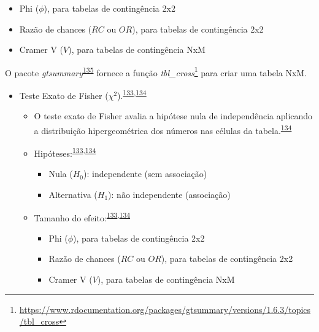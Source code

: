 \documentclass[
  a4paper,
]{book}
\renewcommand{\href}[2]{#2\footnote{\url{#1}}}
\newenvironment{infobox}[1]
  {
  \begin{itemize}
  \renewcommand{\labelitemi}{
    \raisebox{-.7\height}[0pt][0pt]{
      {\setkeys{Gin}{width=3em,keepaspectratio}
        \texttt{[image: \#1]}}
    }
  }
  \setlength{\fboxsep}{1em}
  \begin{blackbox}
  \item
  }
  {
  \end{blackbox}
  \end{itemize}
  }
\begin{document}
\begin{itemize}
\begin{itemize}
    \begin{itemize}
    \item
      Phi (\(\phi\)), para tabelas de contingência 2x2
    \item
      Razão de chances (\(RC\) ou \(OR\)), para tabelas de contingência 2x2
    \item
      Cramer V (\(V\)), para tabelas de contingência NxM
    \end{itemize}
  \end{itemize}
\end{itemize}

\begin{infobox}{images/Rlogo}
O pacote \emph{gtsummary}\textsuperscript{\protect\hyperlink{ref-gtsummary}{135}} fornece a função \href{https://www.rdocumentation.org/packages/gtsummary/versions/1.6.3/topics/tbl_cross}{\emph{tbl\_cross}} para criar uma tabela NxM.

\end{infobox}

\begin{itemize}
\item
  Teste Exato de Fisher (\(\chi^2\)).\textsuperscript{\protect\hyperlink{ref-McHugh2013}{133},\protect\hyperlink{ref-Kim2017a}{134}}

  \begin{itemize}
  \item
    O teste exato de Fisher avalia a hipótese nula de independência aplicando a distribuição hipergeométrica dos números nas células da tabela.\textsuperscript{\protect\hyperlink{ref-Kim2017a}{134}}
  \item
    Hipóteses:\textsuperscript{\protect\hyperlink{ref-McHugh2013}{133},\protect\hyperlink{ref-Kim2017a}{134}}

    \begin{itemize}
    \item
      Nula (\(H_{0}\)): independente (sem associação)
    \item
      Alternativa (\(H_{1}\)): não independente (associação)
    \end{itemize}
  \item
    Tamanho do efeito:\textsuperscript{\protect\hyperlink{ref-McHugh2013}{133},\protect\hyperlink{ref-Kim2017a}{134}}

    \begin{itemize}
    \item
      Phi (\(\phi\)), para tabelas de contingência 2x2
    \item
      Razão de chances (\(RC\) ou \(OR\)), para tabelas de contingência 2x2
    \item
      Cramer V (\(V\)), para tabelas de contingência NxM
    \end{itemize}
  \end{itemize}
\end{itemize}
\end{document}

